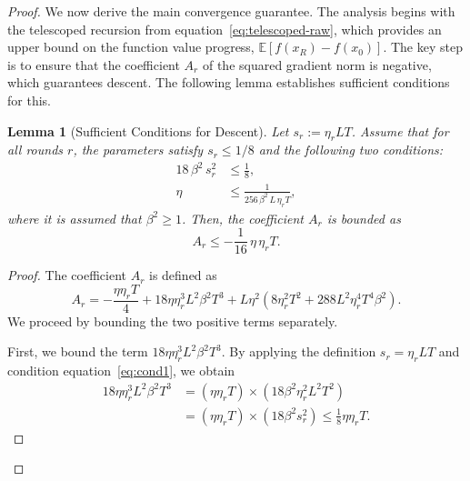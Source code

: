 \documentclass{article} %
\def\eqref#1{equation~\ref{#1}}
\newcommand{\E}{\mathbb{E}}
\newtheorem{lemma}{Lemma}
\begin{document}
\begin{proof}
We now derive the main convergence guarantee. The analysis begins with the telescoped recursion from \eqref{eq:telescoped-raw}, which provides an upper bound on the function value progress, $\E[f(x_R) - f(x_0)]$. The key step is to ensure that the coefficient $A_r$ of the squared gradient norm is negative, which guarantees descent. The following lemma establishes sufficient conditions for this.

\begin{lemma}[Sufficient Conditions for Descent]
\label{lem:descent_conditions}
Let $s_r := \eta_r L T$. Assume that for all rounds $r$, the parameters satisfy $s_r \le 1/8$ and the following two conditions:
\begin{align}
    18\,\beta^{2}\,s_r^{2} &\le \frac{1}{8}, \label{eq:cond1} \\
    \eta &\le \frac{1}{256\,\beta^{2}\,L\,\eta_r T}, \label{eq:cond2}
\end{align}
where it is assumed that $\beta^2 \ge 1$. Then, the coefficient $A_r$ is bounded as
\[
    A_r \le -\frac{1}{16}\,\eta\,\eta_r T.
\]
\end{lemma}

\begin{proof}
The coefficient $A_r$ is defined as
\[
A_r = -\frac{\eta\eta_r T}{4} + 18\eta\eta_r^3 L^2 \beta^2 T^3 + L\eta^2(8\eta_r^2 T^2 + 288 L^2 \eta_r^4 T^4 \beta^2).
\]
We proceed by bounding the two positive terms separately.

First, we bound the term $18\eta\eta_r^3 L^2 \beta^2 T^3$. By applying the definition $s_r = \eta_r L T$ and condition \eqref{eq:cond1}, we obtain
\begin{align*}
    18\eta\eta_r^3 L^2 \beta^2 T^3 &= (\eta\eta_r T) \times (18 \beta^2 \eta_r^2 L^2 T^2) \\
    &= (\eta\eta_r T) \times (18 \beta^2 s_r^2) \le \frac{1}{8}\eta\eta_r T.
\end{align*}


\end{proof}
\end{proof}
\end{document}
